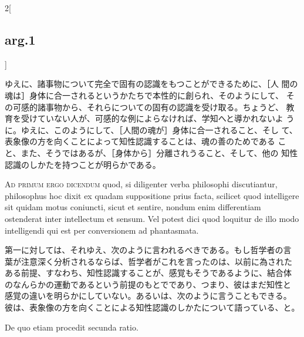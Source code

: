 \documentclass[paper=a4paper,fontsize=10pt,jafontsize=9pt,titlepage]{jlreq}
\begin{document}
\begin{paracol}{2}[\subsection{arg.1}]
\switchcolumn

ゆえに、諸事物について完全で固有の認識をもつことができるために、［人
間の魂は］身体に合一されるというかたちで本性的に創られ、そのようにして、
その可感的諸事物から、それらについての固有の認識を受け取る。ちょうど、
教育を受けていない人が、可感的な例によらなければ、学知へと導かれないよ
うに。ゆえに、このようにして、［人間の魂が］身体に合一されること、そし
て、表象像の方を向くことによって知性認識することは、魂の善のためである
こと、また、そうではあるが、［身体から］分離されうること、そして、他の
知性認識のしかたを持つことが明らかである。

\switchcolumn*[\subsection{ad.1}]

{\scshape Ad primum ergo dicendum} quod, si diligenter verba philosophi
discutiantur,
philosophus hoc dixit ex quadam suppositione prius facta, scilicet
quod intelligere sit quidam motus coniuncti, sicut et sentire, nondum
enim differentiam ostenderat inter intellectum et sensum. Vel potest
dici quod loquitur de illo modo intelligendi qui est per conversionem
ad phantasmata.

\switchcolumn

第一に対しては、それゆえ、次のように言われるべきである。もし哲学者の言
葉が注意深く分析されるならば、哲学者がこれを言ったのは、以前に為された
ある前提、すなわち、知性認識することが、感覚もそうであるように、結合体
のなんらかの運動であるという前提のもとでであり、つまり、彼はまだ知性と
感覚の違いを明らかにしていない。あるいは、次のように言うこともできる。
彼は、表象像の方を向くことによる知性認識のしかたについて語っている、と。

\switchcolumn*

De quo etiam procedit secunda ratio.


\end{paracol}
\end{document}
